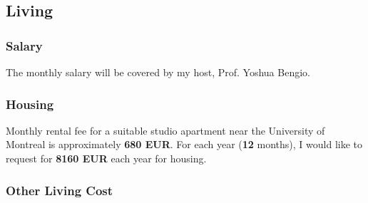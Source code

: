 \documentclass[11pt, oneside]{essay}
\begin{document}
\subsection{Living}

\subsubsection{Salary}

The monthly salary will be covered by my host, Prof. Yoshua Bengio.

\subsubsection{Housing}

Monthly rental fee for a suitable studio apartment near the
University of Montreal is approximately \textbf{680 EUR}. For
each year (\textbf{12} months), I would like to request for
\textbf{8160 EUR} each year for housing.

\subsubsection{Other Living Cost}








%
%
\end{document}
